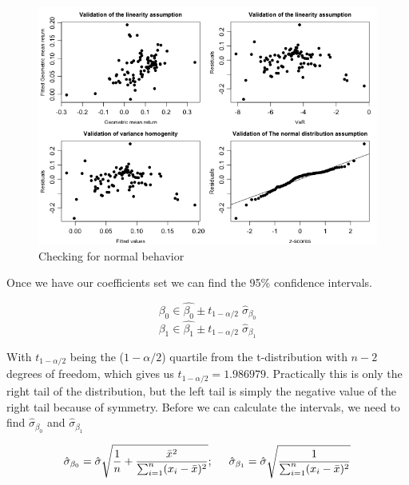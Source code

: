 \documentclass{article}
\begin{document}
\begin{figure}[h!]
\centering
\includegraphics[width=\textwidth]{fig/normal_check.png}
\caption{Checking for normal behavior}
\label{fig:normal_check}
\end{figure}

Once we have our coefficients set we can find the 95\% confidence intervals.

\begin{equation}\label{beta0_int}
\beta_0 \in \hat{\beta_0} \pm t_{1-\alpha/2} \; \hat{\sigma}_{\beta_0}
\end{equation}
\begin{equation}\label{beta1_int}
\beta_1 \in \hat{\beta_1} \pm t_{1-\alpha/2} \; \hat{\sigma}_{\beta_1}
\end{equation}

With $t_{1-\alpha/2}$ being the ($1-\alpha/2$) quartile from the t-distribution with $n-2$ degrees of freedom, which gives us $t_{1-\alpha/2}=1.986979$. Practically this is only the right tail of the distribution, but the left tail is simply the negative value of the right tail because of symmetry. Before we can calculate the intervals, we need to find $\hat{\sigma}_{\beta_0}$ and $\hat{\sigma}_{\beta_1}$ 

\begin{equation}
\hat{\sigma}_{\beta_0}=
                \hat{\sigma}\sqrt{\frac{1}{n} + 
                \frac{\bar{x}^2}{\sum_{i=1}^n (x_i-\bar{x})^2}} ; \hspace{5mm}
\hat{\sigma}_{\beta_1}=
                \hat{\sigma}\sqrt{
                \frac{1}{\sum_{i=1}^n (x_i-\bar{x})^2}}
\end{equation}
\\
\end{document}
